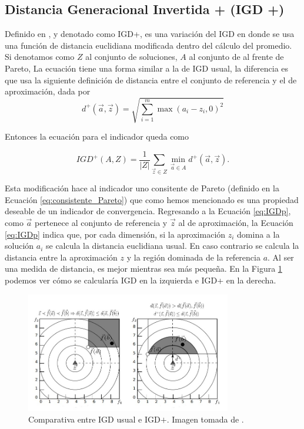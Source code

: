 \subsection{Distancia Generacional Invertida + (IGD +)} \label{sec:IGDp}
Definido en \cite{ishibuchiModifiedDistanceCalculation2015}, y denotado como IGD+, es una variación del IGD en donde se usa una función de distancia euclidiana modificada dentro del cálculo del promedio. Si denotamos como $Z$ al conjunto de soluciones, $A$ al conjunto de al frente de Pareto, La ecuación tiene una forma similar a la de IGD usual, la diferencia es que usa la siguiente definición de distancia entre el conjunto de referencia y el de aproximación, dada por $$d^{+}(\vec{a},\vec{z})=\sqrt{\sum_{i=1}^m \max(a_i-z_i,0)^2} $$

Entonces la ecuación para el indicador queda como

\begin{equation} \label{eq:IGDp}
    IGD^+(A,Z) =  \frac{1}{|Z|} \sum_{\vec{z}\in Z}\min_{\vec{a}\in A} d^{+}(\vec{a},\vec{z}).
\end{equation}


Esta modificación hace al indicador uno consitente de Pareto (definido en la Ecuación \ref{eq:consistente_Pareto}) que como hemos mencionado es una propiedad deseable de un indicador de convergencia. Regresando a la Ecuación \ref{eq:IGDp}, como $\vec{a}$ pertenece al conjunto de referencia y $\vec{z}$ al de aproximación, la Ecuación \ref{eq:IGDp} indica que, por cada dimensión, si la aproximación $z_i$ domina a la solución $a_i$ se calcula la distancia euclidiana usual. En caso contrario se calcula la distancia entre la aproximación $z$ y la región dominada de la referencia $a$. Al ser una medida de distancia, es mejor mientras sea más pequeña. En la Figura \ref{fig:comp_IGD_IGDp} podemos ver cómo se calcularía IGD en la izquierda e IGD+ en la derecha. 

\begin{figure}[H]
    \centering
    \includegraphics[width=0.8\textwidth]{./Figuras/IGDp.jpg} 
    \caption[IGD vs IGD+]{Comparativa entre IGD usual e IGD$+$. Imagen tomada de \cite{tesis_mst_guillermo}.}
    \label{fig:comp_IGD_IGDp}
\end{figure}

